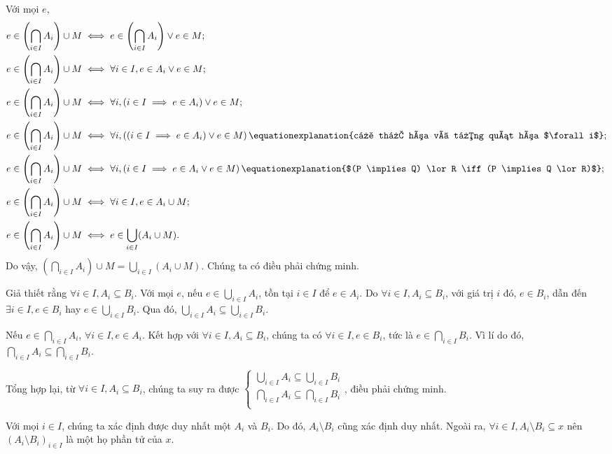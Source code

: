 \stepSubexercise Với mọi $e$,
\begin{align*}
   e \in \left(\bigcap_{i \in I} A_i\right) \cup M &\iff e \in \left(\bigcap_{i \in I} A_i\right) \lor e \in M; \\
   e \in \left(\bigcap_{i \in I} A_i\right) \cup M &\iff \forall i \in I, e \in A_i \lor e \in M; \\
   e \in \left(\bigcap_{i \in I} A_i\right) \cup M &\iff \forall i, (i \in I \implies e \in A_i) \lor e \in M; \\
   e \in \left(\bigcap_{i \in I} A_i\right) \cup M &\iff \forall i , \left((i \in I \implies e \in A_i) \lor e \in M\right) \equationexplanation{cụ thể hóa và tổng quát hóa $\forall i$}; \\
   e \in \left(\bigcap_{i \in I} A_i\right) \cup M &\iff \forall i , \left(i \in I \implies e \in A_i \lor e \in M\right) \equationexplanation{$(P \implies Q) \lor R \iff (P \implies Q \lor R)$}; \\
   e \in \left(\bigcap_{i \in I} A_i\right) \cup M &\iff \forall i \in I, e \in A_i \cup M; \\
   e \in \left(\bigcap_{i \in I} A_i\right) \cup M &\iff e \in \bigcup_{i \in I}(A_i \cup M).
\end{align*}
Do vậy, $\left(\bigcap_{i \in I} A_i\right) \cup M = \bigcup_{i \in I}(A_i \cup M)$. Chúng ta có điều phải chứng minh.

\stepSubexercise Giả thiết rằng $\forall i \in I, A_i \subseteq B_i$. Với mọi $e$, nếu $e \in \bigcup_{i \in I}A_i$, tồn tại $i \in I$ để $e \in A_i$. Do $\forall i \in I, A_i \subseteq B_i$, với giá trị $i$ đó, $e \in B_i$, dẫn đến $\exists i \in I, e \in B_i$ hay $e \in \bigcup_{i \in I}B_i$. Qua đó, $\bigcup_{i \in I}A_i \subseteq \bigcup_{i \in I}B_i$.

Nếu $e \in \bigcap_{i \in I}A_i$, $\forall i \in I, e \in A_i$. Kết hợp với $\forall i \in I, A_i \subseteq B_i$, chúng ta có $\forall i \in I, e \in B_i$, tức là $e \in \bigcap_{i \in I}B_i$. Vì lí do đó, $\bigcap_{i \in I}A_i \subseteq \bigcap_{i \in I}B_i$.

Tổng hợp lại, từ $\forall i \in I, A_i \subseteq B_i$, chúng ta suy ra được $\begin{cases}
   \bigcup_{i \in I} A_i \subseteq \bigcup_{i \in I}B_i \\
   \bigcap_{i \in I} A_i \subseteq \bigcap_{i \in I}B_i \\
\end{cases}$, điều phải chứng minh.

\stepSubexercise Với mọi $i \in I$, chúng ta xác định được duy nhất một $A_i$ và $B_i$. Do đó, $A_i \setminus B_i$ cũng xác định duy nhất. Ngoài ra, $\forall i \in I, A_i \setminus B_i \subseteq x$ nên $\left(A_i \setminus B_i\right)_{i \in I}$ là một họ phần tử của $x$.

